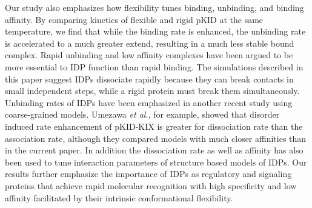 \documentclass[../talant.diss.submit.tex]{subfiles}
\begin{document}
Our study also emphasizes how flexibility tunes binding, unbinding, and binding
affinity.  By comparing kinetics of flexible and rigid pKID at the same
temperature, we find that while the binding rate is enhanced, the unbinding rate
is accelerated to a much greater extend, resulting in a much less stable bound
complex. Rapid unbinding and low affinity complexes have been argued to be more
essential to IDP function than rapid binding.\cite{zhou:12} The simulations
described in this paper suggest IDPs dissociate rapidly because they can break
contacts in small independent steps, while a rigid protein must break them
simultaneously.  Unbinding rates of IDPs have been emphasized in another recent
study using coarse-grained models.  Umezawa \textit{et al.}, for example, showed
that disorder induced rate enhancement of pKID-KIX is greater for dissociation
rate than the association rate, although they compared models with much closer
affinities than in the current paper\cite{umezawa:16}. In addition the
dissociation rate as well as affinity has also been used to tune interaction
parameters of structure based models of IDPs.\cite{cao:16}
Our results further emphasize the importance of IDPs as regulatory and signaling proteins that
achieve rapid molecular recognition with high specificity and low affinity facilitated by
their intrinsic conformational flexibility.
\end{document}
